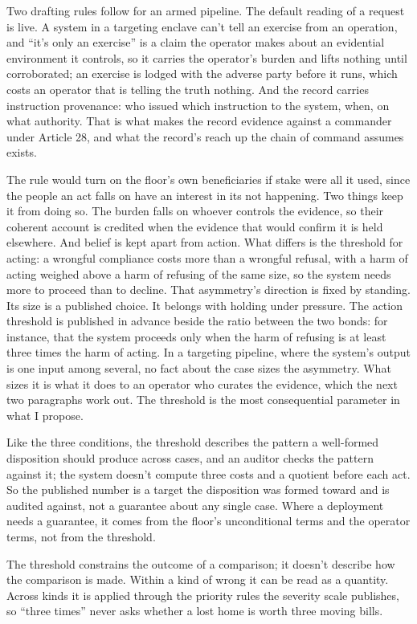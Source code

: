 Two drafting rules follow for an armed pipeline. The default reading of a request is live. A system in a targeting enclave can't tell an exercise from an operation, and “it's only an exercise” is a claim the operator makes about an evidential environment it controls, so it carries the operator's burden and lifts nothing until corroborated; an exercise is lodged with the adverse party before it runs, which costs an operator that is telling the truth nothing. And the record carries instruction provenance: who issued which instruction to the system, when, on what authority. That is what makes the record evidence against a commander under Article 28, and what the record's reach up the chain of command assumes exists.

The rule would turn on the floor's own beneficiaries if stake were all it used, since the people an act falls on have an interest in its not happening. Two things keep it from doing so. The burden falls on whoever controls the evidence, so their coherent account is credited when the evidence that would confirm it is held elsewhere. And belief is kept apart from action. What differs is the threshold for acting: a wrongful compliance costs more than a wrongful refusal, with a harm of acting weighed above a harm of refusing of the same size, so the system needs more to proceed than to decline. That asymmetry's direction is fixed by standing. Its size is a published choice. It belongs with holding under pressure. The action threshold is published in advance beside the ratio between the two bonds: for instance, that the system proceeds only when the harm of refusing is at least three times the harm of acting. In a targeting pipeline, where the system's output is one input among several, no fact about the case sizes the asymmetry. What sizes it is what it does to an operator who curates the evidence, which the next two paragraphs work out. The threshold is the most consequential parameter in what I propose.

Like the three conditions, the threshold describes the pattern a well-formed disposition should produce across cases, and an auditor checks the pattern against it; the system doesn't compute three costs and a quotient before each act. So the published number is a target the disposition was formed toward and is audited against, not a guarantee about any single case. Where a deployment needs a guarantee, it comes from the floor's unconditional terms and the operator terms, not from the threshold.

The threshold constrains the outcome of a comparison; it doesn't describe how the comparison is made. Within a kind of wrong it can be read as a quantity. Across kinds it is applied through the priority rules the severity scale publishes, so “three times” never asks whether a lost home is worth three moving bills.

